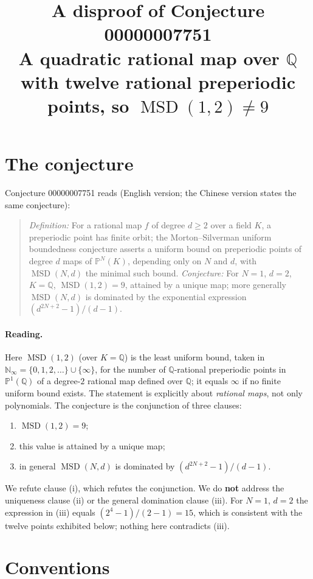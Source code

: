 \documentclass[11pt]{article}
\title{A disproof of Conjecture 00000007751\\[2pt]
\large A quadratic rational map over $\mathbb{Q}$ with twelve rational preperiodic points,
so $\operatorname{MSD}(1,2)\ne 9$}
\date{}
\theoremstyle{definition}
\theoremstyle{remark}
\renewcommand{\_}{\oldus\allowbreak}
\newcommand{\MSD}{\operatorname{MSD}}
\newcommand{\PP}{\mathbb{P}^1(\mathbb{Q})}
\newcommand{\Q}{\mathbb{Q}}
\begin{document}
\sloppy
\maketitle

\section{The conjecture}

Conjecture 00000007751 reads (English version; the Chinese version states the same conjecture):

\begin{quote}
\emph{Definition:} For a rational map $f$ of degree $d\ge 2$ over a field $K$, a preperiodic point has
finite orbit; the Morton--Silverman uniform boundedness conjecture asserts a uniform bound on preperiodic
points of degree $d$ maps of $\mathbb{P}^N(K)$, depending only on $N$ and $d$, with $\MSD(N,d)$ the minimal
such bound.
\emph{Conjecture:} For $N=1$, $d=2$, $K=\Q$, $\MSD(1,2)=9$, attained by a unique map; more generally
$\MSD(N,d)$ is dominated by the exponential expression $(d^{2N+2}-1)/(d-1)$.
\end{quote}

\paragraph{Reading.} Here $\MSD(1,2)$ (over $K=\Q$) is the least uniform bound, taken in
$\mathbb{N}_\infty=\{0,1,2,\dots\}\cup\{\infty\}$, for the number of $\Q$-rational preperiodic points in
$\PP$ of a degree-$2$ rational map defined over $\Q$; it equals $\infty$ if no finite uniform bound
exists. The statement is explicitly about \emph{rational maps}, not only polynomials. The conjecture is the
conjunction of three clauses:
\begin{enumerate}[label=(\roman*)]
  \item $\MSD(1,2) = 9$;
  \item this value is attained by a unique map;
  \item in general $\MSD(N,d)$ is dominated by $(d^{2N+2}-1)/(d-1)$.
\end{enumerate}
We refute clause (i), which refutes the conjunction. We do \textbf{not} address the uniqueness clause (ii)
or the general domination clause (iii). For $N=1$, $d=2$ the expression in (iii) equals
$(2^4-1)/(2-1) = 15$, which is consistent with the twelve points exhibited below; nothing here contradicts
(iii).

\section{Conventions}
\end{document}
